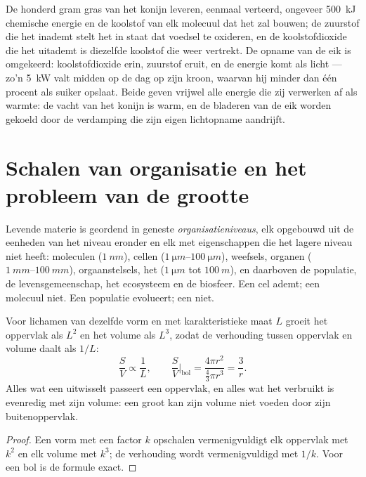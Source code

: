 \begin{example}\label{ex:b1:organism-environment:rabbitoak}
De honderd gram gras van het konijn leveren, eenmaal verteerd, ongeveer
\qty{500}{kJ} chemische energie en de koolstof van elk molecuul dat het
zal bouwen; de zuurstof die het inademt stelt het in staat dat voedsel te
oxideren, en de koolstofdioxide die het uitademt is diezelfde koolstof die
weer vertrekt. De opname van de eik is omgekeerd: koolstofdioxide erin,
zuurstof eruit, en de energie komt als licht --- zo'n \qty{5}{kW} valt
midden op de dag op zijn kroon, waarvan hij minder dan één procent als
suiker opslaat. Beide geven vrijwel alle energie die zij verwerken af als
warmte: de vacht van het konijn is warm, en de bladeren van de eik worden
gekoeld door de verdamping die zijn eigen lichtopname aandrijft.
\end{example}

\section{Schalen van organisatie en het probleem van de grootte}

\begin{definition}[Organisatieniveaus]\label{def:b1:organism-environment:levels}
Levende materie is geordend in geneste
\emph{organisatieniveaus}, elk opgebouwd uit de
eenheden van het niveau eronder en elk met eigenschappen die het lagere
niveau niet heeft: moleculen ($\qty{1}{nm}$), cellen
($\qtyrange{1}{100}{\micro m}$), weefsels, organen
($\qtyrange{1}{100}{mm}$), orgaanstelsels, het 
($\qty{1}{\micro m}$ tot $\qty{100}{m}$), en daarboven de populatie, de
levensgemeenschap, het ecosysteem en de biosfeer. Een cel ademt; een
molecuul niet. Een populatie evolueert; een  niet.
\end{definition}

\begin{proposition}\label{prop:b1:organism-environment:sv}
Voor lichamen van dezelfde vorm en met karakteristieke maat $L$ groeit het
oppervlak als $L^2$ en het volume als $L^3$, zodat de verhouding tussen
oppervlak en volume daalt als $1/L$:
\[
\frac{S}{V} \propto \frac{1}{L}, \qquad
\frac{S}{V}\Big|_{\text{bol}} = \frac{4\pi r^2}{\tfrac{4}{3}\pi r^3} = \frac{3}{r}.
\]
Alles wat een  uitwisselt passeert een oppervlak, en alles wat het
verbruikt is evenredig met zijn volume: een groot  kan zijn volume
niet voeden door zijn buitenoppervlak.
\end{proposition}
\begin{proof}
Een vorm met een factor $k$ opschalen vermenigvuldigt elk oppervlak met
$k^2$ en elk volume met $k^3$; de verhouding wordt vermenigvuldigd met
$1/k$. Voor een bol is de formule exact.
\end{proof}

